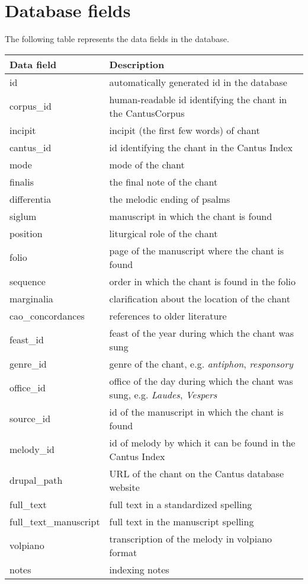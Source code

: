 \section{Database fields}

The following table represents the data fields in the database.

\begin{longtable}{| p{} | p{} |} 

 \hline
 Data field & Description \\
 \hline
 id             & automatically generated id in the database \\ \hline
 corpus\_id     & human-readable id identifying the chant in the CantusCorpus \\ \hline
 incipit        & incipit (the first few words) of chant \\ \hline
 cantus\_id     & id identifying the chant in the Cantus Index \\ \hline
 mode           & mode of the chant \\ \hline
 finalis        & the final note of the chant \\ \hline
 differentia    & the melodic ending of psalms \\ \hline
 siglum         & manuscript in which the chant is found \\ \hline
 position       & liturgical role of the chant \\ \hline
 folio          & page of the manuscript where the chant is found \\ \hline
 sequence       & order in which the chant is found in the folio \\ \hline
 marginalia     & clarification about the location of the chant \\ \hline
 cao\_concordances & references to older literature \\ \hline
 feast\_id      & feast of the year during which the chant was sung \\ \hline
 genre\_id      & genre of the chant, e.g. \emph{antiphon}, \emph{responsory} \\ \hline
 office\_id     & office of the day during which the chant was sung, e.g. \emph{Laudes}, \emph{Vespers} \\ \hline
 source\_id     & id of the manuscript in which the chant is found \\ \hline
 melody\_id     & id of melody by which it can be found in the Cantus Index \\ \hline
 drupal\_path   & URL of the chant on the Cantus database website \\ \hline
 full\_text     & full text in a standardized spelling \\ \hline
 full\_text\_manuscript & full text in the manuscript spelling \\ \hline
 volpiano       & transcription of the melody in volpiano format \\ \hline
 notes          & indexing notes \\
 \hline


\end{longtable}
